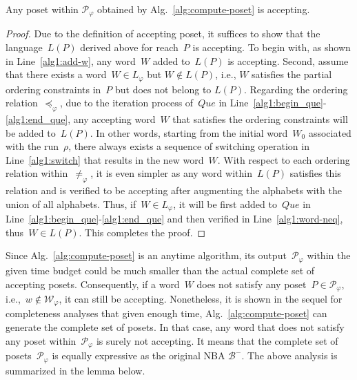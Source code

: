 \begin{lemma}\label{lemma:accepting-poset}
Any poset within $\mathcal{P}_{\varphi}$ obtained by Alg.~\ref{alg:compute-poset}
is accepting.
\end{lemma}
\begin{proof}
Due to the definition of accepting poset, it suffices to show that the
language~$L(P)$ derived above for reach~$P$ is accepting.
To begin with, as shown in Line~\ref{alg1:add-w}, any word~$W$ added to~$L(P)$
is accepting.
Second, assume that there exists a word~$W\in L_\varphi$ but $W\notin L(P)$, i.e.,
$W$ satisfies the partial ordering constraints in~$P$ but does not belong to $L(P)$.
Regarding the ordering relation~$\preceq_{\varphi}$,
due to the iteration process of~$Que$ in Line~\ref{alg1:begin_que}-\ref{alg1:end_que},
any accepting word~$W$ that satisfies the ordering constraints will be added
to~$L(P)$.
In other words, starting from the initial word~$W_0$ associated with the run~$\rho$,
there always exists a sequence of switching operation in Line~\ref{alg1:switch} that results
in the new word~$W$.
With respect to each ordering relation within~$\neq_{\varphi}$, it is even simpler
as any word within~$L(P)$ satisfies this relation and is verified to be accepting
after augmenting the alphabets with the union of all alphabets.
Thus, if~$W\in L_{\varphi}$, it will be first added to~$Que$ in
Line~\ref{alg1:begin_que}-\ref{alg1:end_que} and then
verified in Line~\ref{alg1:word-neq}, thus~$W\in L(P)$. This completes the proof.
\end{proof}



Since Alg.~\ref{alg:compute-poset} is an anytime algorithm,
its output~$\mathcal{P}_{\varphi}$ within the given time budget
could be much smaller than the actual complete set of accepting posets.
Consequently, if a word~$W$ does not satisfy
any poset~$P\in \mathcal{P}_{\varphi}$, i.e.,~$w\notin \mathcal{W}_{\varphi}$,
it can still be accepting.
Nonetheless, it is shown in the sequel for completeness analyses that
given enough time, Alg.~\ref{alg:compute-poset} can generate
the complete set of posets.
In that case, any word that does not satisfy any poset
within~$\mathcal{P}_{\varphi}$ is surely not accepting.
It means that the complete set of posets~$\mathcal{P}_{\varphi}$ is
equally expressive as the original NBA $\mathcal{B}^-$.
The above analysis is summarized in the lemma below.


